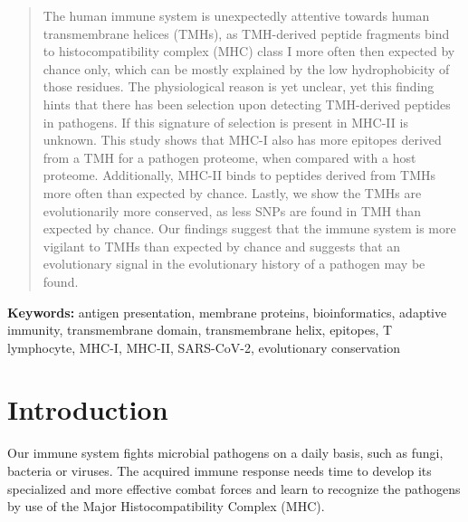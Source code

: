 \begin{abstract}

The human immune system is unexpectedly attentive towards
human transmembrane helices (TMHs), as TMH-derived peptide fragments
bind to histocompatibility complex (MHC) class I more often then expected
by chance only, which can be mostly explained by the low hydrophobicity
of those residues.
The physiological reason is yet unclear,
yet this finding hints that there has been selection upon detecting TMH-derived
peptides in pathogens.
If this signature of selection is present in MHC-II is unknown.
This study shows that MHC-I also has more
epitopes derived from a TMH for a pathogen proteome, when compared with
a host proteome.
Additionally, MHC-II binds to peptides derived from TMHs 
more often than expected by chance.
Lastly, we show the TMHs are evolutionarily more conserved,
as less SNPs are found in TMH than expected by chance.
Our findings suggest that the immune system is more
vigilant to TMHs than expected by chance
and suggests that an evolutionary signal in the evolutionary history of a pathogen
may be found.

\end{abstract}

{\bf Keywords:} antigen presentation, membrane proteins, bioinformatics, 
adaptive immunity, transmembrane domain, transmembrane helix, 
epitopes, T lymphocyte, MHC-I, MHC-II, SARS-CoV-2, evolutionary conservation

\section{Introduction}


Our immune system fights microbial pathogens on a daily basis,
such as fungi, bacteria or viruses.
The acquired immune response
needs time to develop its specialized and more effective
combat forces and learn to recognize the pathogens 
by use of the Major Histocompatibility Complex (MHC).


